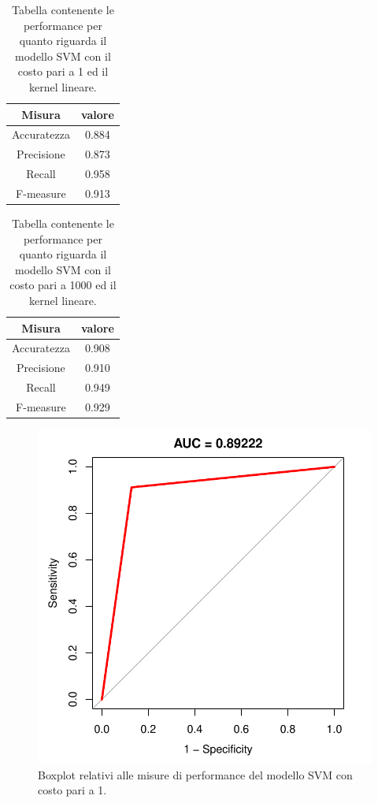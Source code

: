 \begin{table}
	\caption{Tabella contenente le performance per quanto riguarda il modello SVM con il costo pari a 1 ed il kernel lineare.}
	
	\label{tab:svm_perf}
	
	\centering
	\begin{tabular}{c|c}
		Misura & valore \\
		\hline
		Accuratezza & 0.884 \\
		Precisione & 0.873 \\
		Recall & 0.958 \\
		F-measure & 0.913 \\
	\end{tabular}
\end{table}

\begin{table}
	\caption{Tabella contenente le performance per quanto riguarda il modello SVM con il costo pari a 1000 ed il kernel lineare.}
	
	\label{tab:svm1000_perf}
	
	\centering
	\begin{tabular}{c|c}
		Misura & valore \\
		\hline
		Accuratezza & 0.908 \\
		Precisione & 0.910 \\
		Recall &  0.949\\
		F-measure & 0.929 \\
	\end{tabular}
\end{table}

\begin{figure}
	\centering
	\includegraphics[width=0.7\linewidth]{../FinalResults/Images/svm/auc.pdf}
	\caption{Boxplot relativi alle misure di performance del modello SVM con costo pari a 1.}
	\label{fig:svmperformance}
\end{figure}

